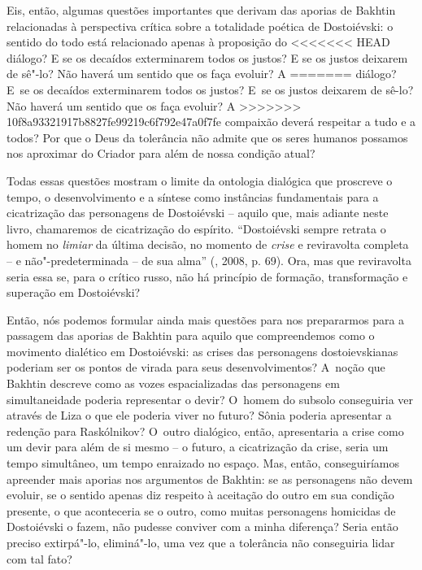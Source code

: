 {{Eis, então, algumas questões importantes que derivam das aporias de
Bakhtin relacionadas à perspectiva crítica sobre a totalidade poética de
Dostoiévski: o sentido do todo está relacionado apenas à proposição do
<<<<<<< HEAD
diálogo? E se os decaídos exterminarem todos os justos? E se os justos
deixarem de sê"-lo? Não haverá um sentido que os faça evoluir? A
=======
diálogo? E~se os decaídos exterminarem todos os justos? E~se os justos
deixarem de sê-lo? Não haverá um sentido que os faça evoluir? A
>>>>>>> 10f8a93321917b8827fe99219c6f792e47a0f7fe
compaixão deverá respeitar a tudo e a todos? Por que o Deus da
tolerância não admite que os seres humanos possamos nos aproximar do
Criador para além de nossa condição atual?

Todas essas questões mostram o limite da ontologia dialógica que
proscreve o tempo, o desenvolvimento e a síntese como instâncias
fundamentais para a cicatrização das personagens de Dostoiévski --
aquilo que, mais adiante neste livro, chamaremos de cicatrização do
espírito. ``Dostoiévski sempre retrata o homem no \emph{limiar} da
última decisão, no momento de \emph{crise} e reviravolta completa -- e
não"-predeterminada -- de sua alma'' (, 2008, p. 69). Ora, mas que
reviravolta seria essa se, para o crítico russo, não há princípio de
formação, transformação e superação em Dostoiévski?

Então, nós podemos formular ainda mais questões para nos prepararmos
para a passagem das aporias de Bakhtin para aquilo que compreendemos
como o movimento dialético em Dostoiévski: as crises das personagens
dostoievskianas poderiam ser os pontos de virada para seus
desenvolvimentos? A~noção que Bakhtin descreve como as vozes
espacializadas das personagens em simultaneidade poderia representar o
devir? O~homem do subsolo conseguiria ver através de Liza o que ele
poderia viver no futuro? Sônia poderia apresentar a redenção para
Raskólnikov? O~outro dialógico, então, apresentaria a crise como um
devir para além de si mesmo -- o futuro, a cicatrização da crise, seria
um tempo simultâneo, um tempo enraizado no espaço. Mas, então,
conseguiríamos apreender mais aporias nos argumentos de Bakhtin: se as
personagens não devem evoluir, se o sentido apenas diz respeito à
aceitação do outro em sua condição presente, o que aconteceria se o
outro, como muitas personagens homicidas de Dostoiévski o fazem, não
pudesse conviver com a minha diferença? Seria então preciso extirpá"-lo,
eliminá"-lo, uma vez que a tolerância não conseguiria lidar com tal fato?

}}
